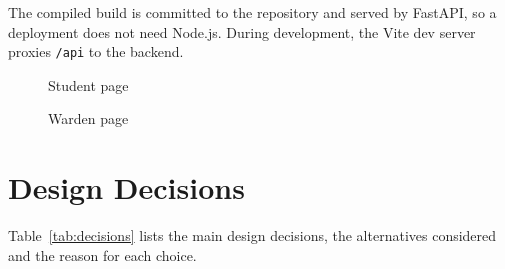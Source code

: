 The compiled build is committed to the repository and served by FastAPI,
so a deployment does not need Node.js. During development, the Vite dev
server proxies \texttt{/api} to the backend.

\begin{figure}[H]
\centering
{}
\caption{Student page}
\label{fig:student}
\end{figure}

\begin{figure}[H]
\centering
{}
\caption{Warden page}
\label{fig:admin}
\end{figure}

\section{Design Decisions}
\label{sec:decisions}

Table~\ref{tab:decisions} lists the main design decisions, the
alternatives considered and the reason for each choice.

